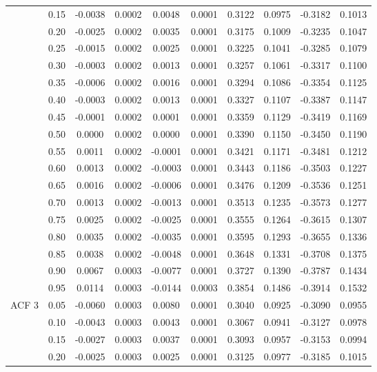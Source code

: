 \begin{table}[H]
\begin{tabular}{cccccccccc}
   & 0.15 & -0.0038 & 0.0002 & 0.0048 & 0.0001 & 0.3122 & 0.0975 & -0.3182 & 0.1013 \\ 
   & 0.20 & -0.0025 & 0.0002 & 0.0035 & 0.0001 & 0.3175 & 0.1009 & -0.3235 & 0.1047 \\ 
   & 0.25 & -0.0015 & 0.0002 & 0.0025 & 0.0001 & 0.3225 & 0.1041 & -0.3285 & 0.1079 \\ 
   & 0.30 & -0.0003 & 0.0002 & 0.0013 & 0.0001 & 0.3257 & 0.1061 & -0.3317 & 0.1100 \\ 
   & 0.35 & -0.0006 & 0.0002 & 0.0016 & 0.0001 & 0.3294 & 0.1086 & -0.3354 & 0.1125 \\ 
   & 0.40 & -0.0003 & 0.0002 & 0.0013 & 0.0001 & 0.3327 & 0.1107 & -0.3387 & 0.1147 \\ 
   & 0.45 & -0.0001 & 0.0002 & 0.0001 & 0.0001 & 0.3359 & 0.1129 & -0.3419 & 0.1169 \\ 
   & 0.50 & 0.0000 & 0.0002 & 0.0000 & 0.0001 & 0.3390 & 0.1150 & -0.3450 & 0.1190 \\ 
   & 0.55 & 0.0011 & 0.0002 & -0.0001 & 0.0001 & 0.3421 & 0.1171 & -0.3481 & 0.1212 \\ 
   & 0.60 & 0.0013 & 0.0002 & -0.0003 & 0.0001 & 0.3443 & 0.1186 & -0.3503 & 0.1227 \\ 
   & 0.65 & 0.0016 & 0.0002 & -0.0006 & 0.0001 & 0.3476 & 0.1209 & -0.3536 & 0.1251 \\ 
   & 0.70 & 0.0013 & 0.0002 & -0.0013 & 0.0001 & 0.3513 & 0.1235 & -0.3573 & 0.1277 \\ 
   & 0.75 & 0.0025 & 0.0002 & -0.0025 & 0.0001 & 0.3555 & 0.1264 & -0.3615 & 0.1307 \\ 
   & 0.80 & 0.0035 & 0.0002 & -0.0035 & 0.0001 & 0.3595 & 0.1293 & -0.3655 & 0.1336 \\ 
   & 0.85 & 0.0038 & 0.0002 & -0.0048 & 0.0001 & 0.3648 & 0.1331 & -0.3708 & 0.1375 \\ 
   & 0.90 & 0.0067 & 0.0003 & -0.0077 & 0.0001 & 0.3727 & 0.1390 & -0.3787 & 0.1434 \\ 
   & 0.95 & 0.0114 & 0.0003 & -0.0144 & 0.0003 & 0.3854 & 0.1486 & -0.3914 & 0.1532 \\ 
  ACF 3 & 0.05 & -0.0060 & 0.0003 & 0.0080 & 0.0001 & 0.3040 & 0.0925 & -0.3090 & 0.0955 \\ 
   & 0.10 & -0.0043 & 0.0003 & 0.0043 & 0.0001 & 0.3067 & 0.0941 & -0.3127 & 0.0978 \\ 
   & 0.15 & -0.0027 & 0.0003 & 0.0037 & 0.0001 & 0.3093 & 0.0957 & -0.3153 & 0.0994 \\ 
   & 0.20 & -0.0025 & 0.0003 & 0.0025 & 0.0001 & 0.3125 & 0.0977 & -0.3185 & 0.1015 \\ 

\end{tabular}
\end{table}
